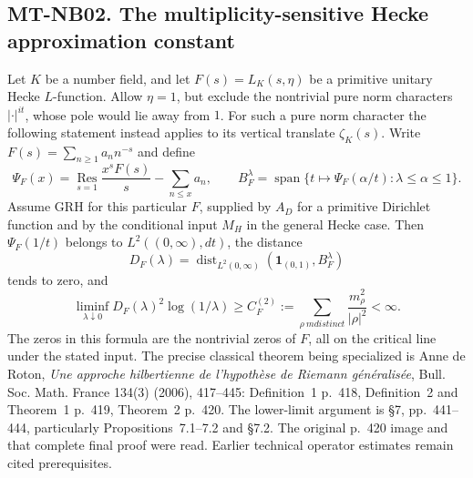 \subsection*{MT-NB02. The multiplicity-sensitive Hecke approximation constant}

Let $K$ be a number field, and let $F(s)=L_K(s,\eta)$ be a
primitive unitary Hecke $L$-function. Allow $\eta=1$, but exclude
the nontrivial pure norm characters $|\cdot|^{it}$, whose pole
would lie away from $1$. For such a pure norm character the
following statement instead applies to its vertical translate
$\zeta_K(s)$. Write $F(s)=\sum_{n\ge1}a_n n^{-s}$ and define
\[
 \Psi_F(x)=\operatorname*{Res}_{s=1}
                   \frac{x^s F(s)}s-\sum_{n\le x}a_n,
 \qquad
 B_F^\lambda=\operatorname{span}\{
                  t\longmapsto\Psi_F(\alpha/t):
                               \lambda\le\alpha\le1\}.
 \tag{NB02.1}
\]
Assume GRH for this particular $F$, supplied by $A_D$ for a
primitive Dirichlet function and by the conditional input
$M_H$ in the general Hecke case. Then $\Psi_F(1/t)$ belongs
to $L^2((0,\infty),dt)$, the distance
\[
 D_F(\lambda)=\operatorname{dist}_{L^2(0,\infty)}
                      (\mathbf1_{(0,1)},B_F^\lambda)
 \tag{NB02.2}
\]
tends to zero, and
\[
 \liminf_{\lambda\downarrow0}D_F(\lambda)^2\log(1/\lambda)
    \ge C_F^{(2)}:=\sum_{\rho\ {
m distinct}}
                          \frac{m_\rho^2}{|\rho|^2}<\infty.
 \tag{NB02.3}
\]
The zeros in this formula are the nontrivial zeros of $F$,
all on the critical line under the stated input.
The precise classical theorem being specialized is
Anne de Roton, \emph{Une approche hilbertienne de
l'hypoth\`ese de Riemann g\'en\'eralis\'ee}, Bull. Soc.
Math. France 134(3) (2006), 417--445: Definition~1 p.~418,
Definition~2 and Theorem~1 p.~419, Theorem~2 p.~420.
The lower-limit argument is \S7, pp.~441--444, particularly
Propositions~7.1--7.2 and \S7.2. The original p.~420 image
and that complete final proof were read. Earlier technical
operator estimates remain cited prerequisites.

